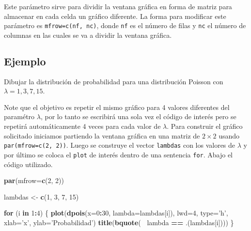 \documentclass[10pt,]{krantz}
\makeatletter
\newenvironment{Shaded}{\begin{snugshade}}{\end{snugshade}}
\newcommand{\KeywordTok}[1]{\textcolor[rgb]{0.13,0.29,0.53}{\textbf{#1}}}
\newcommand{\DataTypeTok}[1]{\textcolor[rgb]{0.13,0.29,0.53}{#1}}
\newcommand{\DecValTok}[1]{\textcolor[rgb]{0.00,0.00,0.81}{#1}}
\newcommand{\StringTok}[1]{\textcolor[rgb]{0.31,0.60,0.02}{#1}}
\newcommand{\ControlFlowTok}[1]{\textcolor[rgb]{0.13,0.29,0.53}{\textbf{#1}}}
\newcommand{\OperatorTok}[1]{\textcolor[rgb]{0.81,0.36,0.00}{\textbf{#1}}}
\newcommand{\NormalTok}[1]{#1}
\newenvironment{kframe}{%
\medskip{}
\setlength{\fboxsep}{.8em}
 \def\at@end@of@kframe{}%
 \ifinner\ifhmode%
  \def\at@end@of@kframe{\end{minipage}}%
  \begin{minipage}{\columnwidth}%
 \fi\fi%
 \def\FrameCommand##1{\hskip\@totalleftmargin \hskip-\fboxsep
 \colorbox{shadecolor}{##1}\hskip-\fboxsep
     \hskip-\linewidth \hskip-\@totalleftmargin \hskip\columnwidth}%
 \MakeFramed {\advance\hsize-\width
   \@totalleftmargin\z@ \linewidth\hsize
   \@setminipage}}%
 {\par\unskip\endMakeFramed%
 \at@end@of@kframe}
\renewenvironment{Shaded}{\begin{kframe}}{\end{kframe}}
\makeatother
\begin{document}
Este parámetro sirve para dividir la ventana gráfica en forma de matriz
para almacenar en cada celda un gráfico diferente. La forma para
modificar este parámetro es \texttt{mfrow=c(nf,\ nc)}, donde \texttt{nf}
es el número de filas y \texttt{nc} el número de columnas en las cuales
se va a dividir la ventana gráfica.

\subsection*{Ejemplo}\label{ejemplo-36}


Dibujar la distribución de probabilidad para una distribución Poisson
con \(\lambda=1, 3, 7, 15\).

Note que el objetivo es repetir el mismo gráfico para 4 valores
diferentes del paramétro \(\lambda\), por lo tanto se escribirá una sola
vez el código de interés pero se repetirá automáticamente 4 veces para
cada valor de \(\lambda\). Para construir el gráfico solicitado
iniciamos partiendo la ventana gráfica en una matriz de \(2 \times 2\)
usando \texttt{par(mfrow=c(2,\ 2))}. Luego se construye el vector
\texttt{lambdas} con los valores de \(\lambda\) y por último se coloca
el \texttt{plot} de interés dentro de una sentencia \texttt{for}. Abajo
el código utilizado.

\begin{Shaded}
\begin{Highlighting}[]
\KeywordTok{par}\NormalTok{(}\DataTypeTok{mfrow=}\KeywordTok{c}\NormalTok{(}\DecValTok{2}\NormalTok{, }\DecValTok{2}\NormalTok{))}

\NormalTok{lambdas <-}\StringTok{ }\KeywordTok{c}\NormalTok{(}\DecValTok{1}\NormalTok{, }\DecValTok{3}\NormalTok{, }\DecValTok{7}\NormalTok{, }\DecValTok{15}\NormalTok{)}

\ControlFlowTok{for}\NormalTok{ (i }\ControlFlowTok{in} \DecValTok{1}\OperatorTok{:}\DecValTok{4}\NormalTok{) \{}
  \KeywordTok{plot}\NormalTok{(}\KeywordTok{dpois}\NormalTok{(}\DataTypeTok{x=}\DecValTok{0}\OperatorTok{:}\DecValTok{30}\NormalTok{, }\DataTypeTok{lambda=}\NormalTok{lambdas[i]), }\DataTypeTok{lwd=}\DecValTok{4}\NormalTok{,}
       \DataTypeTok{type=}\StringTok{'h'}\NormalTok{, }\DataTypeTok{xlab=}\StringTok{'x'}\NormalTok{, }\DataTypeTok{ylab=}\StringTok{'Probabilidad'}\NormalTok{)}
  \KeywordTok{title}\NormalTok{(}\KeywordTok{bquote}\NormalTok{(}\OperatorTok{~}\StringTok{ }\NormalTok{lambda }\OperatorTok{==}\StringTok{ }\NormalTok{.(lambdas[i])))}
\NormalTok{\} }
\end{Highlighting}
\end{Shaded}
\end{document}
